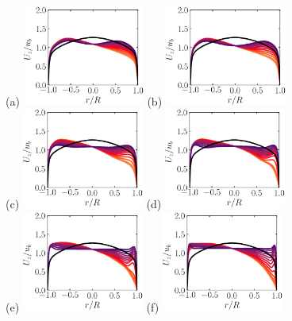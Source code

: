 \documentclass[lineno]{jfm}
\begin{document}
	\begin{figure}
		\centering
		(a) \includegraphics[width=4cm]{Figures/prof_uzub_rotz0_roty0.00390625.eps}
                (b) \includegraphics[width=4cm]{Figures/prof_uzub_rotz0_roty0.0078125.eps} \\
                (c) \includegraphics[width=4cm]{Figures/prof_uzub_rotz0_roty0.015625.eps}
                (d) \includegraphics[width=4cm]{Figures/prof_uzub_rotz0_roty0.03125.eps} \\
                (e) \includegraphics[width=4cm]{Figures/prof_uzub_rotz0_roty0.0625.eps} 
                (f) \includegraphics[width=4cm]{Figures/prof_uzub_rotz0_roty0.125.eps} \\

\end{figure}
\end{document}
